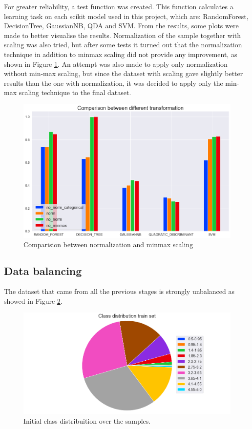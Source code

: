 \documentclass[../main]{subfiles}
\begin{document}
For greater reliability, a test function was created.
This function calculates a learning task on each scikit model used in this project, which are: RandomForest, DecisionTree, GaussianNB, QDA and SVM.
From the results, some plots were made to better visualise the results.
Normalization of the sample together with scaling was also tried, but after some tests it turned out that the normalization technique in addition to minmax scaling did not provide any improvement, as shown in Figure \ref{fig:plot_data_transformation}.
An attempt was also made to apply only normalization without min-max scaling, but since the dataset with scaling gave slightly better results than the one with normalization, it was decided to apply only the min-max scaling technique to the final dataset.

\begin{figure}[h]
    \begin{center}
        \includegraphics[width=0.7\linewidth]{figures/data_transformation.png}
    \end{center}
    
    \caption{Comparision between normalization and minmax scaling}
    \label{fig:plot_data_transformation}
\end{figure}


\subsection*{Data balancing}
The dataset that came from all the previous stages is strongly unbalanced as showed in Figure \ref{fig:unbalanced}.
\begin{figure}[h]
    \begin{center}
        \includegraphics[width=0.5\linewidth]{figures/class_distribution_initial.png}
    \end{center}
    
    \caption{Initial class distribuition over the samples.}
    \label{fig:unbalanced}
\end{figure}
\end{document}
